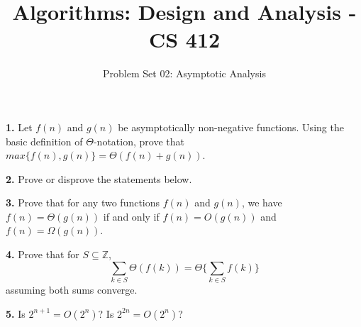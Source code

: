 \documentclass[addpoints]{exam}
\title{Algorithms: Design and Analysis - CS 412 }
\author{Problem Set 02: Asymptotic Analysis}
\date{}
\begin{document}
\maketitle

\begin{questions}
  \question
  \textbf{1. } Let $ f(n) $ and $ g(n) $ be asymptotically non-negative functions. Using the basic definition of $ \Theta $-notation, prove that $ max\{f(n), g(n)\} = \Theta(f(n) + g(n)) $.
  \begin{solution}

  \end{solution}

  \question
  \textbf{2. } Prove or disprove the statements below.
  \begin{solution}
  \end{solution}

  \question
  \textbf{3. } Prove that for any two functions $ f(n) $ and $ g(n) $, we have $ f(n) = \Theta(g(n)) $ if and only if $ f(n) = O(g(n)) $ and $ f(n) = \Omega(g(n)) $.
  \begin{solution}

  \end{solution}

  \question
  \textbf{4. } Prove that for $ S \subseteq \mathbb{Z} $, $$ \sum_{k \in S} \Theta(f(k)) = \Theta \biggl\{ \sum_{k \in S} f(k) \biggr\} $$ assuming both sums converge.
  \begin{solution}

  \end{solution}

  \question
  \textbf{5. } Is $ 2^{n + 1} = O(2^n)$? Is $ 2^{2n} = O(2^n) $? 

\end{questions}
\end{document}
